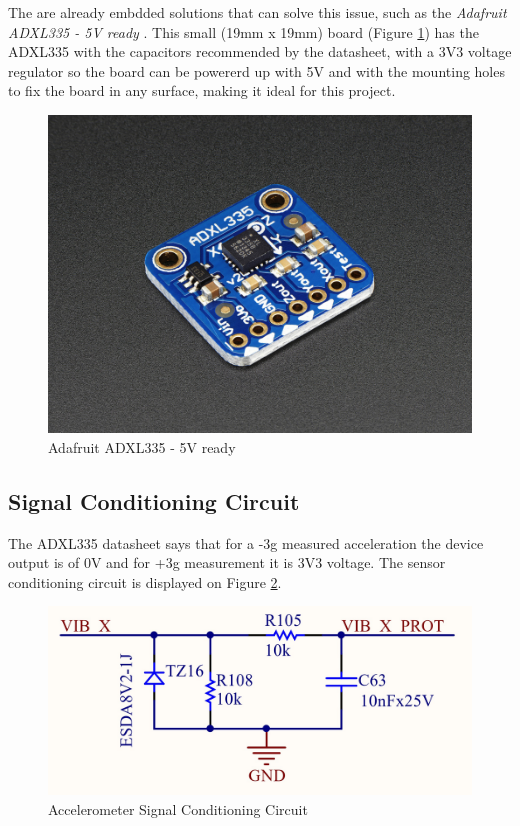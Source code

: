 	The are already embdded solutions that can solve this issue, such as the \textit{Adafruit ADXL335 - 5V ready} \cite{adafruit-5v-ready}. This small (19mm x 19mm) board (Figure \ref{fig:adafruit-adxl335}) has the ADXL335 with the capacitors recommended by the datasheet, with a 3V3 voltage regulator so the board can be powererd up with 5V and with the mounting holes to fix the board in any surface, making it ideal for this project.

	\begin{figure}[htbp]
		\centering
		\includegraphics[width=.5\textwidth]{figuras/fig-adafruit-adxl335.jpg}
		\caption{Adafruit ADXL335 - 5V ready \cite{adafruit-adxl335}}
		\label{fig:adafruit-adxl335}
	\end{figure}


\subsection{Signal Conditioning Circuit}\label{ssec:accelerometer-signal-conditioning-circuit}

	The ADXL335 datasheet \cite{devices2010adxl335} says that for a -3g measured acceleration the device output is of 0V and for +3g measurement it is 3V3 voltage. The sensor conditioning circuit is displayed on Figure \ref{fig:accelerometer-signal-conditioning-circuit}.

	\begin{figure}[htbp]
		\centering
		\includegraphics[width=.8\textwidth]{figuras/fig-accelerometer-signal-conditioning-circuit}
		\caption{Accelerometer Signal Conditioning Circuit}
		\label{fig:accelerometer-signal-conditioning-circuit}
	\end{figure}


